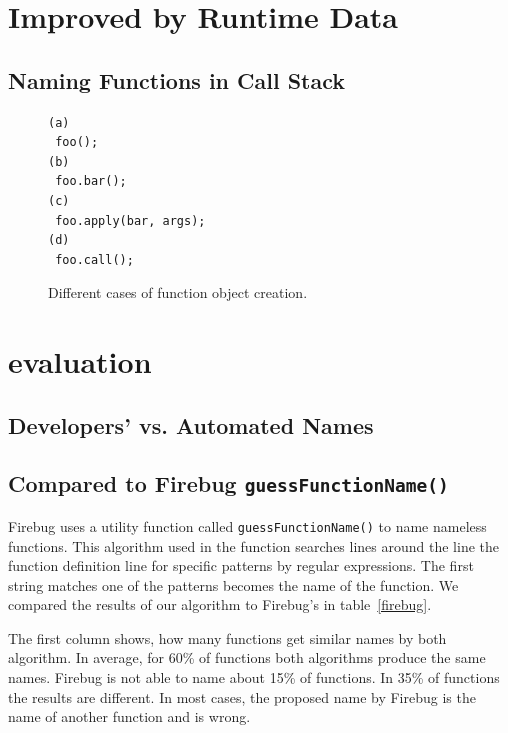 \documentclass[10pt, preprint]{sigplanconf}
\begin{document}
\section{Improved by Runtime Data}
\subsection{Naming Functions in Call Stack}







\begin{figure}[htp]
\begin{verbatim}
(a)
 foo();
(b)
 foo.bar();
(c)
 foo.apply(bar, args);
(d)
 foo.call();
\end{verbatim}
\caption{Different cases of function object creation.}
\label{fig:functionCall}
\end{figure}



\section{evaluation}

\subsection{Developers' vs. Automated Names}

\subsection{Compared to Firebug {\large \texttt{guessFunctionName()}}}
Firebug uses a utility function called {\small \texttt{guessFunctionName()}} to name nameless functions.
This algorithm used in the function searches lines around the line the function definition line for specific patterns by regular expressions. The
  first string matches one of the patterns becomes the name of the function. We compared the results of our algorithm to Firebug's in table~\ref{firebug}.
  
The first column shows, how many functions get similar names by both algorithm. In average, for 60\% of functions both algorithms produce the same names.
Firebug is not able to name about 15\% of functions. In 35\% of functions the results are different. In most cases, the proposed name by Firebug is the name of another function and is wrong.
  
\end{document}
